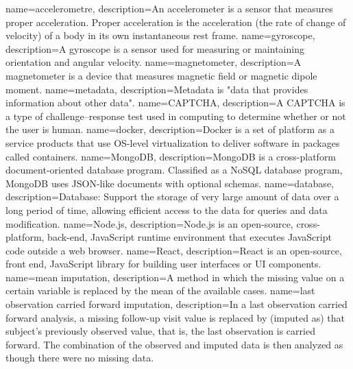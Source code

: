 {
    name={accelerometre},
    description={An accelerometer is a sensor that measures proper acceleration. Proper acceleration is the acceleration (the rate of change of velocity) of a body in its own instantaneous rest frame.
    }
}
{
    name={gyroscope},
    description={A gyroscope is a sensor used for measuring or maintaining orientation and angular velocity. 
    }
}
{
    name={magnetometer},
    description={A magnetometer is a device that measures magnetic field or magnetic dipole moment.}
}
{
    name={metadata},
    description={Metadata is "data that provides information about other data".}
}
{
    name={CAPTCHA},
    description={A CAPTCHA is a type of challenge–response test used in computing to determine whether or not the user is human.}
}
{
    name={docker},
    description={Docker is a set of platform as a service products that use OS-level virtualization to deliver software in packages called containers.}
}
{
    name={MongoDB},
    description={MongoDB is a cross-platform document-oriented database program. Classified as a NoSQL database program, MongoDB uses JSON-like documents with optional schemas.}
}
{
    name={database},
    description={Database: Support the storage of very large amount of data over a long period of time, allowing efficient access to the data for queries and data modification.}
}
{
    name={Node.js},
    description={Node.js is an open-source, cross-platform, back-end, JavaScript runtime environment that executes JavaScript code outside a web browser.}
}
{
    name={React},
    description={React is an open-source, front end, JavaScript library for building user interfaces or UI components.}
}
{
    name={mean imputation},
    description={A method in which the missing value on a certain variable is replaced by the mean of the available cases.}
}
{
    name={last observation carried forward imputation},
    description={In a last observation carried forward analysis, a missing follow-up visit value is replaced by (imputed as) that subject's previously observed value, that is, the last observation is carried forward. The combination of the observed and imputed data is then analyzed as though there were no missing data.}
}
